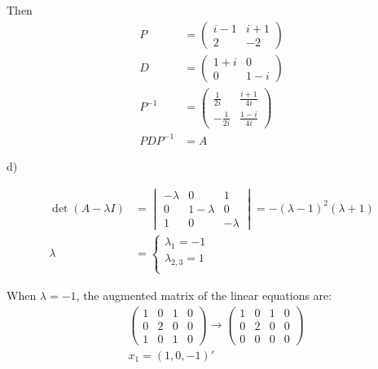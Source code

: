 \documentclass[letterpaper, 11pt]{article}
\newcommand{\1}{\mathds{1}}	%
\theoremstyle{definition}
\begin{document}
Then \begin{align*}
    P &= \begin{pmatrix}
        i-1 & i+1 \\
        2 & -2
    \end{pmatrix} \\
    D &= \begin{pmatrix}
        1+i & 0 \\
        0 & 1-i
    \end{pmatrix} \\
    P ^{-1} &= \begin{pmatrix}
        \frac{1}{2i} & \frac{i+1}{4i} \\
        -\frac{1}{2i} & \frac{1-i}{4i}
    \end{pmatrix} \\
    PDP ^{-1} &=  A
\end{align*}

d)

\begin{align*}
    \det (A-\lambda I) &= \begin{vmatrix}
        -\lambda & 0 & 1 \\
        0 & 1-\lambda & 0 \\
        1 & 0 & -\lambda
    \end{vmatrix} = -(\lambda-1)^{2}(\lambda+1) \\
    \lambda &= \left\{\begin{array}{l}
        \lambda_{1} = -1\\
        \lambda_{2,3} = 1\\
    \end{array}\right.
\end{align*}

When $\lambda = -1$, the augmented matrix of the linear equations are: \begin{align*}
    &\left(\begin{array}{ccc|c}
        1 & 0 & 1 & 0 \\
        0 & 2 & 0 & 0 \\
        1 & 0 & 1 & 0
    \end{array}\right) \to \left(\begin{array}{ccc|c}
        1 & 0 & 1 & 0 \\
        0 & 2 & 0 & 0 \\
        0 & 0 & 0 & 0
    \end{array}\right) \\
    &x_{1} = (1,0,-1)'
\end{align*}
\end{document}
